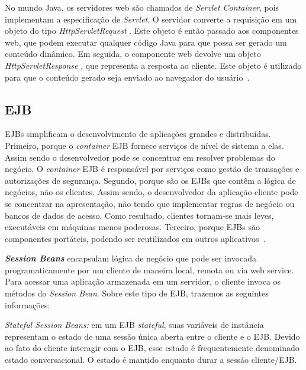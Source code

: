 No mundo Java, os servidores web são chamados de \textit{Servlet Container}, pois implementam a especificação de \textit{Servlet}. O servidor converte a requisição em um objeto do tipo \textit{HttpServletRequest} . Este objeto é então passado aos componentes web, que podem executar qualquer código Java para que possa ser gerado um conteúdo dinâmico. Em seguida, o componente web devolve um objeto \textit{HttpServletResponse} , que representa a resposta ao cliente. Este objeto é utilizado para que o conteúdo gerado seja enviado ao navegador do usuário~\cite{thiagoJava}.







\subsection{EJB}

EJBs simplificam o desenvolvimento de aplicações grandes e distribuídas. Primeiro, porque o \textit{container} EJB fornece serviços de nível de sistema a elas. Assim sendo o desenvolvedor pode se concentrar em resolver problemas do negócio. O \textit{container} EJB é responsável por serviços como gestão de transações e autorizações de segurança. Segundo, porque são os EJBs que contêm a lógica de negócios, não os clientes. Assim sendo, o desenvolvedor da aplicação cliente pode se concentrar na apresentação, não tendo que implementar regras de negócio ou bancos de dados de acesso. Como resultado, clientes tornam-se mais leves, executáveis em máquinas menos poderosas. Terceiro, porque EJBs são componentes portáteis, podendo ser reutilizados em outros aplicativos~\cite{PasteurEJB}. 

\textbf{\textit{Session Beans}} encapsulam lógica de negócio que pode ser invocada programaticamente por um cliente de maneira local, remota ou via web service. Para acessar uma aplicação armazenada em um servidor, o cliente invoca os métodos do \textit{Session Bean}. Sobre este tipo de EJB, trazemos as seguintes informações:

\textit{Stateful Session Beans:} em um EJB \textit{stateful}, suas variáveis de instância representam o estado de uma sessão única aberta entre o cliente e o EJB. Devido ao fato do cliente interagir com o EJB, esse estado é frequentemente denominado estado conversacional. O estado é mantido enquanto durar a sessão cliente/EJB.

